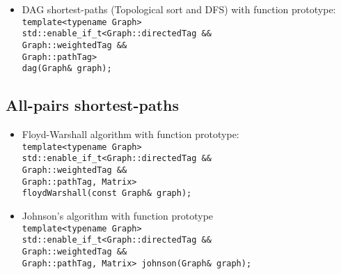 \documentclass{article}
\begin{document}
\begin{itemize}
	\item DAG shortest-paths (Topological sort and DFS) with function prototype:\\
		\texttt{template<typename Graph>\\
			std::enable\_if\_t<Graph::directedTag \&\&\\\hspace*{7.67em}
			Graph::weightedTag \&\&\\\hspace*{7.67em}
			Graph::pathTag>\\
		dag(Graph\& graph);}
\end{itemize}

\subsection*{All-pairs shortest-paths}
\begin{itemize}
	\item Floyd-Warshall algorithm with function prototype:\\
		\texttt{template<typename Graph>\\
			std::enable\_if\_t<Graph::directedTag \&\&\\\hspace*{7.67em}
			Graph::weightedTag \&\&\\\hspace*{7.67em}
			Graph::pathTag, Matrix>\\
		floydWarshall(const Graph\& graph);}
	\item Johnson's algorithm with function prototype\\
		\texttt{template<typename Graph>\\
			std::enable\_if\_t<Graph::directedTag \&\&\\\hspace*{7.67em}
			Graph::weightedTag \&\&\\\hspace*{7.67em}
			Graph::pathTag, Matrix>
		johnson(Graph\& graph);}
\end{itemize}
\end{document}
